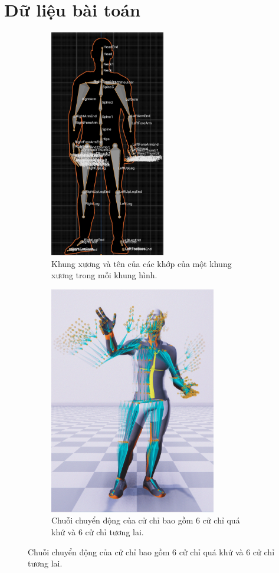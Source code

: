 \section{Dữ liệu bài toán}
\label{sec:Data}


\begin{figure}[H]
	\centering
	\begin{subfigure}{0.49\textwidth}
		\centering
		\includegraphics[height=10cm]{images/Skeleton.png}
		\caption{\small Khung xương và tên của các khớp của một khung xương trong mỗi khung hình.}
		\label{fig:Skeleton}
	\end{subfigure}
	\hfill
	\begin{subfigure}{0.49\textwidth}
		\centering
		\includegraphics[height=10cm]{images/MotionPastAndFuture.png}
		\caption{\small Chuỗi chuyển động của cử chỉ bao gồm 6 cử chỉ quá khứ và 6 cử chỉ tương lai.}
		\label{fig:MotionPastAndFuture}
	\end{subfigure}
\end{figure}

